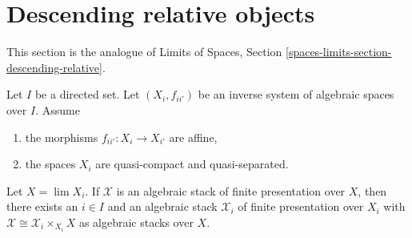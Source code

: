 \section{Descending relative objects}
\label{section-descending-relative}

\noindent
This section is the analogue of
Limits of Spaces, Section \ref{spaces-limits-section-descending-relative}.

\begin{lemma}
\label{lemma-descend-a-stack-down}
Let $I$ be a directed set. Let $(X_i, f_{ii'})$ be an inverse system
of algebraic spaces over $I$. Assume
\begin{enumerate}
\item the morphisms $f_{ii'} : X_i \to X_{i'}$ are affine,
\item the spaces $X_i$ are quasi-compact and quasi-separated.
\end{enumerate}
Let $X = \lim X_i$.
If $\mathcal{X}$ is an algebraic stack of finite presentation over $X$,
then there exists an $i \in I$ and an algebraic stack $\mathcal{X}_i$
of finite presentation over $X_i$ with
$\mathcal{X} \cong \mathcal{X}_i \times_{X_i} X$ as
algebraic stacks over $X$.
\end{lemma}

